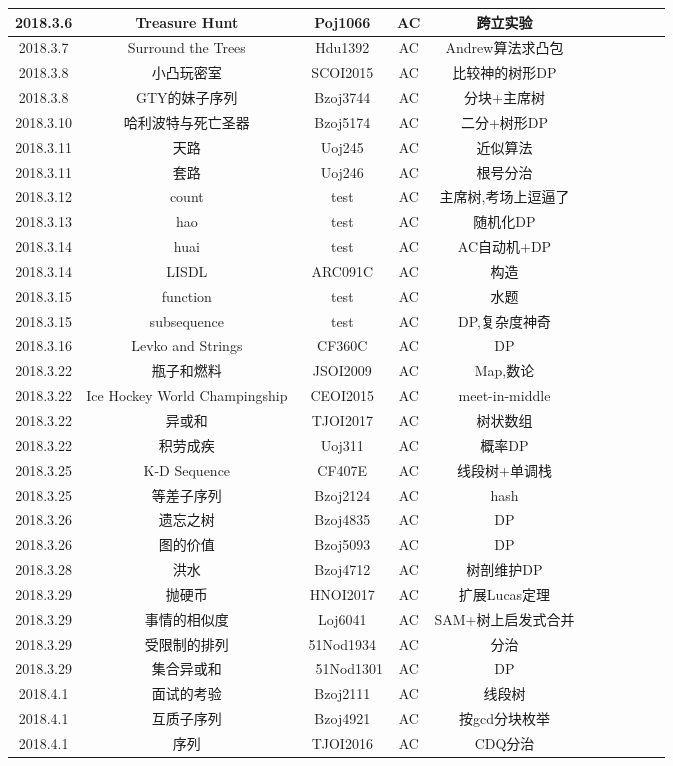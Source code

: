 \documentclass[landscape]{article}
\begin{document}
\begin{longtable}{ccccccccccc}
  \hline
  2018.3.6 & Treasure Hunt & Poj1066 & AC & 跨立实验\\
  \hline
  2018.3.7 & Surround the Trees & Hdu1392 & AC & Andrew算法求凸包\\
  \hline
  2018.3.8 & 小凸玩密室 & SCOI2015 & AC & 比较神的树形DP\\
  \hline
  2018.3.8 & GTY的妹子序列 & Bzoj3744 & AC & 分块+主席树\\
  \hline
  2018.3.10 & 哈利波特与死亡圣器 & Bzoj5174 & AC & 二分+树形DP\\
  \hline
  2018.3.11 & 天路 & Uoj245 & AC & 近似算法\\
  \hline
  2018.3.11 & 套路 & Uoj246 & AC & 根号分治\\
  \hline
  2018.3.12 & count & test & AC & 主席树,考场上逗逼了\\
  \hline
  2018.3.13 & hao & test & AC & 随机化DP\\
  \hline
  2018.3.14 & huai & test & AC & AC自动机+DP\\
  \hline
  2018.3.14 & LISDL & ARC091C & AC & 构造\\
  \hline
  2018.3.15 & function & test & AC & 水题\\
  \hline
  2018.3.15 & subsequence & test & AC & DP,复杂度神奇\\
  \hline
  2018.3.16 & Levko and Strings & CF360C & AC & DP\\
  \hline
  2018.3.22 & 瓶子和燃料 & JSOI2009 & AC & Map,数论\\
  \hline
  2018.3.22 & Ice Hockey World Champingship & CEOI2015 & AC & meet-in-middle\\
  \hline
  2018.3.22 & 异或和 & TJOI2017 & AC & 树状数组\\
  \hline
  2018.3.22 & 积劳成疾 & Uoj311 & AC & 概率DP\\
  \hline
  2018.3.25 & K-D Sequence & CF407E & AC & 线段树+单调栈\\
  \hline
  2018.3.25 & 等差子序列 & Bzoj2124 & AC & hash\\
  \hline
  2018.3.26 & 遗忘之树 & Bzoj4835 & AC & DP\\
  \hline
  2018.3.26 & 图的价值 & Bzoj5093 & AC & DP\\
  \hline
  2018.3.28 & 洪水 & Bzoj4712 & AC & 树剖维护DP\\
  \hline
  2018.3.29 & 抛硬币 & HNOI2017 & AC & 扩展Lucas定理\\
  \hline
  2018.3.29 & 事情的相似度 & Loj6041 & AC & SAM+树上启发式合并\\
  \hline
  2018.3.29 & 受限制的排列 & 51Nod1934 & AC & 分治\\
  \hline
  2018.3.29 & 集合异或和 &　51Nod1301 & AC & DP\\
  \hline
  2018.4.1 & 面试的考验 & Bzoj2111 & AC & 线段树\\
  \hline
  2018.4.1 & 互质子序列 & Bzoj4921 & AC & 按gcd分块枚举\\
  \hline
  2018.4.1 & 序列 & TJOI2016 & AC & CDQ分治\\
  \hline
  
\end{longtable}
\end{document}
